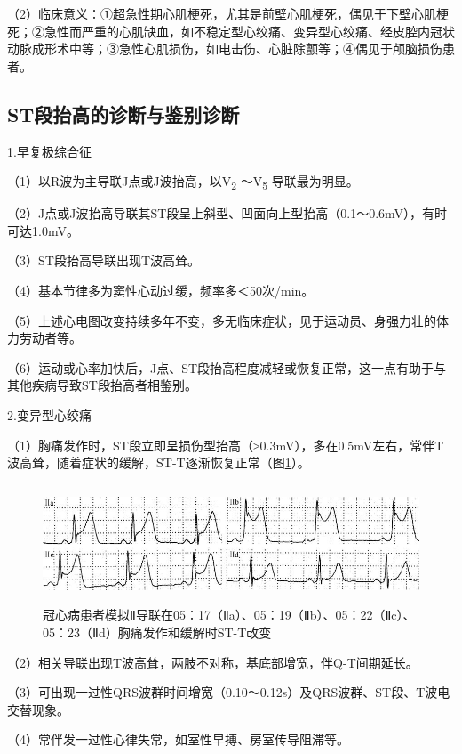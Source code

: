 （2）临床意义：①超急性期心肌梗死，尤其是前壁心肌梗死，偶见于下壁心肌梗死；②急性而严重的心肌缺血，如不稳定型心绞痛、变异型心绞痛、经皮腔内冠状动脉成形术中等；③急性心肌损伤，如电击伤、心脏除颤等；④偶见于颅脑损伤患者。

\protect\hypertarget{text00011.htmlux5cux23subid79}{}{}

\subsection{ST段抬高的诊断与鉴别诊断}

1.早复极综合征

（1）以R波为主导联J点或J波抬高，以V\textsubscript{2}
～V\textsubscript{5} 导联最为明显。

（2）J点或J波抬高导联其ST段呈上斜型、凹面向上型抬高（0.1～0.6mV），有时可达1.0mV。

（3）ST段抬高导联出现T波高耸。

（4）基本节律多为窦性心动过缓，频率多＜50次/min。

（5）上述心电图改变持续多年不变，多无临床症状，见于运动员、身强力壮的体力劳动者等。

（6）运动或心率加快后，J点、ST段抬高程度减轻或恢复正常，这一点有助于与其他疾病导致ST段抬高者相鉴别。

2.变异型心绞痛

（1）胸痛发作时，ST段立即呈损伤型抬高（≥0.3mV），多在0.5mV左右，常伴T波高耸，随着症状的缓解，ST-T逐渐恢复正常（图\ref{fig5-7}）。

\begin{figure}[!htbp]
 \centering
 \includegraphics[width=5.58333in,height=1.38542in]{./images/Image00088.jpg}
 \captionsetup{justification=centering}
 \caption{冠心病患者模拟Ⅱ导联在05：17（Ⅱa）、05：19（Ⅱb）、05：22（Ⅱc）、05：23（Ⅱd）胸痛发作和缓解时ST-T改变}
 \label{fig5-7}
  \end{figure} 

（2）相关导联出现T波高耸，两肢不对称，基底部增宽，伴Q-T间期延长。

（3）可出现一过性QRS波群时间增宽（0.10～0.12s）及QRS波群、ST段、T波电交替现象。

（4）常伴发一过性心律失常，如室性早搏、房室传导阻滞等。

